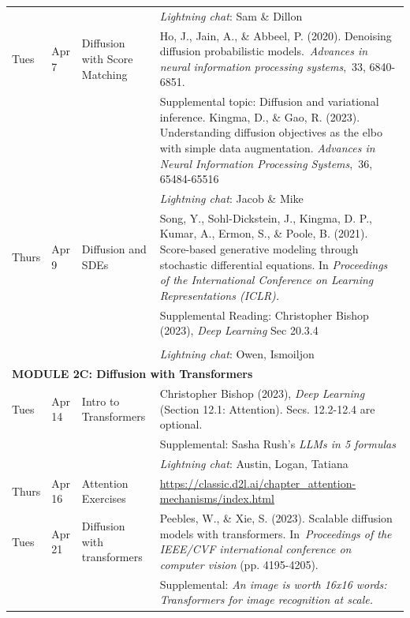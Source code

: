 \documentclass[letterpaper]{inzane_syllabus} %
\begin{document}
\begin{center}
\begin{tabularx}{\textwidth}{p{2cm}p{2cm}p{8cm}p{8cm}}
& & & \textit{Lightning chat}: Sam \& Dillon \\
Tues & Apr 7 & Diffusion with Score Matching & Ho, J., Jain, A., \& Abbeel, P. (2020). Denoising diffusion probabilistic models. \textit{Advances in neural information processing systems}, 33, 6840-6851. \\
 &  &  & Supplemental topic: Diffusion and variational inference.  Kingma, D., \& Gao, R. (2023). Understanding diffusion objectives as the elbo with simple data augmentation. \textit{Advances in Neural Information Processing Systems}, 36, 65484-65516 \\
 & & & \textit{Lightning chat}: Jacob \& Mike \\
Thurs & Apr 9  & Diffusion and SDEs & Song, Y., Sohl-Dickstein, J., Kingma, D. P., Kumar, A., Ermon, S., \& Poole, B. (2021). Score-based generative modeling through stochastic differential equations. In \textit{Proceedings of the International Conference on Learning Representations (ICLR).} \\
& & & Supplemental Reading: Christopher Bishop (2023), \textit{Deep Learning} Sec 20.3.4\\
& & & \\
 & & & \textit{Lightning chat}: Owen, Ismoiljon \\
\hline
\multicolumn{4}{l}{\textbf{\textcolor{myCOLOR}{\large MODULE 2C: Diffusion with Transformers}}} \\
\hline
Tues & Apr 14   & Intro to Transformers  &  Christopher Bishop (2023), \textit{Deep Learning} (Section 12.1: Attention).  Secs. 12.2-12.4 are optional. \\ 
& & & Supplemental: Sasha Rush's \textit{LLMs in 5 formulas}  \\ 
 & & & \textit{Lightning chat}: Austin, Logan, Tatiana \\
Thurs & Apr 16 &  Attention Exercises & \url{https://classic.d2l.ai/chapter_attention-mechanisms/index.html} \\
Tues &  Apr 21  &  Diffusion with transformers & Peebles, W., \& Xie, S. (2023). Scalable diffusion models with transformers. In \textit{Proceedings of the IEEE/CVF international conference on computer vision} (pp. 4195-4205). \\
& & & Supplemental:  \textit{An image is worth 16x16 words: Transformers for image recognition at scale.} \\

\end{tabularx}
\end{center}
\end{document}
